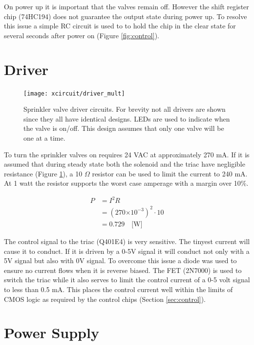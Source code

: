 \documentclass{article}
\providecommand{\e}[1]{\ensuremath{\times 10^{#1}}}
\begin{document}
On power up it is important that the valves remain off.
However the shift register chip (74HC194) does not guarantee
the output state during power up.
To resolve this issue a simple RC circuit is used to to hold the
chip in the clear state for several seconds after power
on (Figure \ref{fig:control}).


\clearpage
\section{Driver}
\label{sec:driver}

\begin{figure}[hbp]
\centering
\texttt{[image: xcircuit/driver\_mult]}
\caption{Sprinkler valve driver circuits.  For brevity not
all drivers are shown since they all have identical designs.
LEDs are used to indicate when the valve is on/off.
This design assumes that only one valve will be one at a time.
}\label{fig:driver}
\end{figure}

To turn the sprinkler valves on requires 24 VAC at approximately 270 mA.
If it is assumed that during steady state both the solenoid
and the triac have negligible resistance (Figure \ref{fig:driver}),
a 10 $\Omega$ resistor can be used to limit the current to 240 mA.
At 1 watt the resistor supports the worst case amperage with a margin
over 10\%.

\begin{align*}
	P &= I^2 R \\
	  &= (270\e{-3})^2 \cdot 10 \\
	  &= 0.729 \quad \text{[W]}
\end{align*}

The control signal to the triac (Q401E4) is very sensitive.
The tinyest current will cause it to conduct.
If it is driven by a 0-5V signal it will conduct not only
with a 5V signal but also with 0V signal.
To overcome this issue a diode was used to ensure no current
flows when it is reverse biased.
The FET (2N7000) is used to switch the triac while it also
serves to limit the control current of a 0-5 volt signal
to less than 0.5 mA.
This places the control current well within the limits
of CMOS logic as required by the control chips (Section \ref{sec:control}).


\clearpage
\section{Power Supply}
\label{sec:power}
\end{document}
